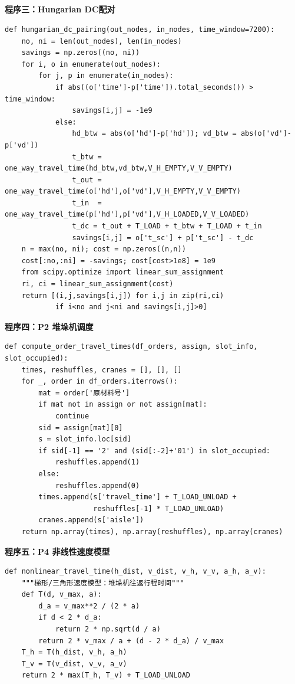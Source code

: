 \documentclass[a4paper]{cumcmthesis}
\begin{document}
\begin{appendices}
\section*{}
\textbf{程序三：Hungarian DC配对}
\begin{lstlisting}[style=pythonstyle, caption={P3: Hungarian DC Pairing}]
def hungarian_dc_pairing(out_nodes, in_nodes, time_window=7200):
    no, ni = len(out_nodes), len(in_nodes)
    savings = np.zeros((no, ni))
    for i, o in enumerate(out_nodes):
        for j, p in enumerate(in_nodes):
            if abs((o['time']-p['time']).total_seconds()) > time_window:
                savings[i,j] = -1e9
            else:
                hd_btw = abs(o['hd']-p['hd']); vd_btw = abs(o['vd']-p['vd'])
                t_btw = one_way_travel_time(hd_btw,vd_btw,V_H_EMPTY,V_V_EMPTY)
                t_out = one_way_travel_time(o['hd'],o['vd'],V_H_EMPTY,V_V_EMPTY)
                t_in  = one_way_travel_time(p['hd'],p['vd'],V_H_LOADED,V_V_LOADED)
                t_dc = t_out + T_LOAD + t_btw + T_LOAD + t_in
                savings[i,j] = o['t_sc'] + p['t_sc'] - t_dc
    n = max(no, ni); cost = np.zeros((n,n))
    cost[:no,:ni] = -savings; cost[cost>1e8] = 1e9
    from scipy.optimize import linear_sum_assignment
    ri, ci = linear_sum_assignment(cost)
    return [(i,j,savings[i,j]) for i,j in zip(ri,ci)
            if i<no and j<ni and savings[i,j]>0]
\end{lstlisting}

\textbf{程序四：P2 堆垛机调度}
\begin{lstlisting}[style=pythonstyle, caption={出库调度与行程时间计算}]
def compute_order_travel_times(df_orders, assign, slot_info, slot_occupied):
    times, reshuffles, cranes = [], [], []
    for _, order in df_orders.iterrows():
        mat = order['原材料号']
        if mat not in assign or not assign[mat]:
            continue
        sid = assign[mat][0]
        s = slot_info.loc[sid]
        if sid[-1] == '2' and (sid[:-2]+'01') in slot_occupied:
            reshuffles.append(1)
        else:
            reshuffles.append(0)
        times.append(s['travel_time'] + T_LOAD_UNLOAD +
                     reshuffles[-1] * T_LOAD_UNLOAD)
        cranes.append(s['aisle'])
    return np.array(times), np.array(reshuffles), np.array(cranes)
\end{lstlisting}

\textbf{程序五：P4 非线性速度模型}
\begin{lstlisting}[style=pythonstyle, caption={梯形速度曲线与行程时间}]
def nonlinear_travel_time(h_dist, v_dist, v_h, v_v, a_h, a_v):
    """梯形/三角形速度模型：堆垛机往返行程时间"""
    def T(d, v_max, a):
        d_a = v_max**2 / (2 * a)
        if d < 2 * d_a:
            return 2 * np.sqrt(d / a)
        return 2 * v_max / a + (d - 2 * d_a) / v_max
    T_h = T(h_dist, v_h, a_h)
    T_v = T(v_dist, v_v, a_v)
    return 2 * max(T_h, T_v) + T_LOAD_UNLOAD
\end{lstlisting}


\end{appendices}
\end{document}
